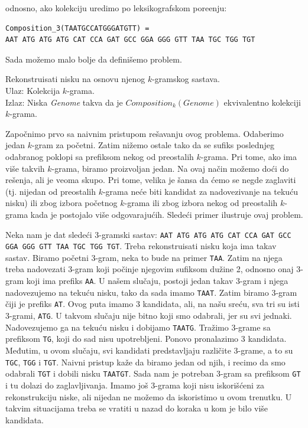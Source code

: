 \noindent odnosno, ako kolekciju uredimo po leksikografskom pore\dj enju:

\begin{lstlisting}
Composition_3(TAATGCCATGGGATGTT) =
AAT ATG ATG ATG CAT CCA GAT GCC GGA GGG GTT TAA TGC TGG TGT
\end{lstlisting}

Sada možemo malo bolje da definišemo problem.

\begin{problem} 
	Rekonstruisati nisku na osnovu njenog $k$-gramskog sastava. \\
	Ulaz: Kolekcija $k$-grama. \\
	Izlaz: Niska \emph{Genome} takva da je $Composition_k(Genome)$ ekvivalentno kolekciji $k$-grama.
\end{problem}

Zapo\v cnimo prvo sa naivnim pristupom re\v savanju ovog problema. Odaberimo jedan $k$-gram za početni. Zatim nižemo ostale tako da se sufiks poslednjeg odabranog poklopi sa prefiksom nekog od preostalih $k$-grama. Pri tome, ako ima više takvih $k$-grama, biramo proizvoljan jedan. Na ovaj način možemo doći do rešenja, ali je veoma skupo. Pri tome, velika je šansa da ćemo se negde zaglaviti (tj. nijedan od preostalih $k$-grama neće biti kandidat za nadovezivanje na tekuću nisku) ili zbog izbora početnog $k$-grama ili zbog izbora nekog od preostalih $k$-grama kada je postojalo više odgovarajućih. Sledeći primer ilustruje ovaj problem.

Neka nam je dat sledeći 3-gramski sastav: \texttt{AAT ATG ATG ATG CAT CCA GAT GCC GGA GGG GTT TAA TGC TGG TGT}. Treba rekonstruisati nisku koja ima takav sastav. Biramo početni 3-gram, neka to bude na primer \texttt{TAA}. Zatim na njega treba nadovezati 3-gram koji počinje njegovim sufiksom dužine 2, odnosno onaj 3-gram koji ima prefiks \texttt{AA}. U našem slučaju, postoji jedan takav 3-gram i njega nadovezujemo na tekuću nisku, tako da sada imamo \texttt{TAAT}. Zatim biramo 3-gram čiji je prefiks \texttt{AT}. Ovog puta imamo 3 kandidata, ali, na našu sreću, sva tri su isti 3-grami, \texttt{ATG}. U takvom slučaju nije bitno koji smo odabrali, jer su svi jednaki. Nadovezujemo ga na tekuću nisku i dobijamo \texttt{TAATG}. Tražimo 3-grame sa prefiksom \texttt{TG}, koji do sad nisu upotrebljeni. Ponovo pronalazimo 3 kandidata. Međutim, u ovom slučaju, svi kandidati predstavljaju različite 3-grame, a to su \texttt{TGC}, \texttt{TGG} i \texttt{TGT}. Naivni pristup kaže da biramo jedan od njih, i recimo da smo odabrali \texttt{TGT} i dobili nisku \texttt{TAATGT}. Sada nam je potreban 3-gram sa prefiksom \texttt{GT} i tu dolazi do zaglavljivanja. Imamo još 3-grama koji nisu iskorišćeni za rekonstrukciju niske, ali nijedan ne možemo da iskoristimo u ovom trenutku. U takvim situacijama treba se vratiti u nazad do koraka u kom je bilo više kandidata.

